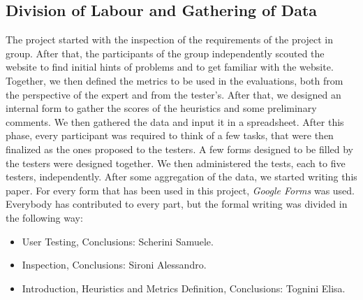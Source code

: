\documentclass[11pt]{article} %
\begin{document}
\subsection{Division of Labour and Gathering of Data}
The project started with the inspection of the requirements of the project in group. After that, the participants of the group independently scouted the website to find initial hints of problems and to get familiar with the website. 
Together, we then defined the metrics to be used in the evaluations, both from the perspective of the expert and from the tester's.
After that, we designed an internal form to gather the scores of the heuristics and some preliminary comments. We then gathered the data and input it in a spreadsheet.
After this phase, every participant was required to think of a few tasks, that were then finalized as the ones proposed to the testers. 
A few forms designed to be filled by the testers were designed together.
We then administered the tests, each to five testers, independently.
After some aggregation of the data, we started writing this paper. 
For every form that has been used in this project, \textit{Google Forms} was used. \\
Everybody has contributed to every part, but the formal writing was divided in the following way:
\begin{itemize}
    \item User Testing, Conclusions: Scherini Samuele.
    \item Inspection, Conclusions: Sironi Alessandro.
    \item Introduction, Heuristics and Metrics Definition, Conclusions: Tognini Elisa.
\end{itemize}
\end{document}
